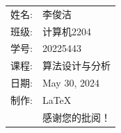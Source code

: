 \documentclass[12pt]{article}
\begin{document}
\begin{flushright}\begin{tabular}{rl}
  姓名: & 李俊洁\\
  班级: & 计算机2204 \\
  学号: & 20225443 \\
  课程: & 算法设计与分析 \\
  日期: & May 30, 2024 \\
  制作: & \LaTeX \\
  & 感谢您的批阅！
\end{tabular}\end{flushright}
\end{document}
